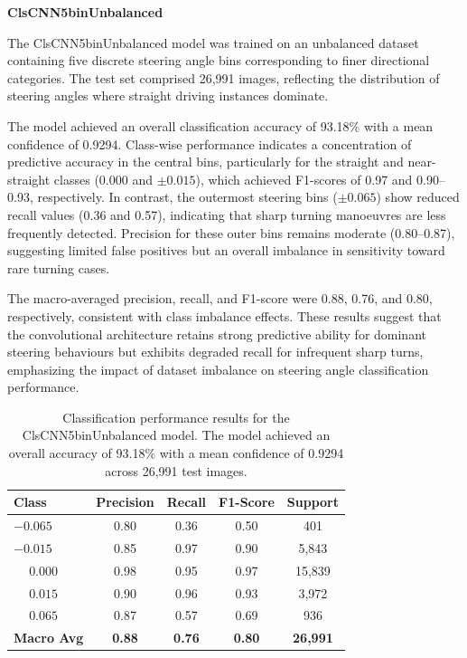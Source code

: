 \textbf{ClsCNN5binUnbalanced}

The ClsCNN5binUnbalanced model was trained on an unbalanced dataset containing five discrete steering angle bins corresponding to finer directional categories. The test set comprised 26,991 images, reflecting the distribution of steering angles where straight driving instances dominate.

The model achieved an overall classification accuracy of 93.18\% with a mean confidence of 0.9294. Class-wise performance indicates a concentration of predictive accuracy in the central bins, particularly for the straight and near-straight classes ($0.000$ and $\pm0.015$), which achieved F1-scores of 0.97 and 0.90–0.93, respectively. In contrast, the outermost steering bins ($\pm0.065$) show reduced recall values (0.36 and 0.57), indicating that sharp turning manoeuvres are less frequently detected. Precision for these outer bins remains moderate (0.80–0.87), suggesting limited false positives but an overall imbalance in sensitivity toward rare turning cases.

The macro-averaged precision, recall, and F1-score were 0.88, 0.76, and 0.80, respectively, consistent with class imbalance effects. These results suggest that the convolutional architecture retains strong predictive ability for dominant steering behaviours but exhibits degraded recall for infrequent sharp turns, emphasizing the impact of dataset imbalance on steering angle classification performance.


\begin{table}[htbp]
\centering
\begin{tabular}{@{}lcccc@{}}
\toprule
\textbf{Class} & \textbf{Precision} & \textbf{Recall} & \textbf{F1-Score} & \textbf{Support} \\
\midrule
$-0.065$ & 0.80 & 0.36 & 0.50 & 401 \\
$-0.015$ & 0.85 & 0.97 & 0.90 & 5,843 \\
$\phantom{-}0.000$ & 0.98 & 0.95 & 0.97 & 15,839 \\
$\phantom{-}0.015$ & 0.90 & 0.96 & 0.93 & 3,972 \\
$\phantom{-}0.065$ & 0.87 & 0.57 & 0.69 & 936 \\
\midrule
\textbf{Macro Avg} & \textbf{0.88} & \textbf{0.76} & \textbf{0.80} & \textbf{26,991} \\
\bottomrule
\end{tabular}
\caption{Classification performance results for the ClsCNN5binUnbalanced model. The model achieved an overall accuracy of 93.18\% with a mean confidence of 0.9294 across 26,991 test images.}
\label{tab:clf_report_ClsCNN5binUnbalanced}
\end{table}

